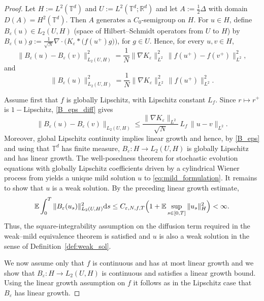 \documentclass[a4paper,12pt]{article}
\newcommand{\mathd}{\mathrm{d}}
\newcommand{\T}{\mathbb{T}}
\begin{document}
\begin{proof} 
Let $H:=L^2(\mathbb T^d)$ and $U:=L^2(\mathbb T^d; \mathbb R^d)$ and let $A:=\frac12\Delta$ with domain
$D(A)=H^2(\mathbb T^d)$.  Then $A$ generates a $C_0$-semigroup on $H$.
For $u\in H$, define $B_\varepsilon(u)\in L_2(U,H)$ (space of Hilbert–Schmidt operators from
$U$ to $H$) by $B_\varepsilon(u)g := \frac{1}{\sqrt{N}}\nabla \cdot \bigl(K_\varepsilon * \bigl(f(u^+)g)\bigr)$, for
$g\in U$. Hence, for every $u,v \in H$,
\begin{equation}\label{B_eps_diff}
    \|B_\varepsilon(u) - B_\varepsilon(v)\|_{L_2(U,H)}^2 =\frac{1}{N}\|\nabla K_\varepsilon\|_{L^2}^2 \,\|f(u^+) - f(v^+)\|_{L^2}^2,
\end{equation}
and 
\begin{equation}\label{B_eps}
    \|B_\varepsilon(u)\|_{L_2(U,H)}^2
=
\frac{1}{N}\|\nabla K_\varepsilon\|_{L^2}^2 \,\|f(u^+)\|_{L^2}^2.
\end{equation}

Assume first that  $f$ is globally Lipschitz, with Lipschitz constant $L_f$. Since $r \mapsto r^+$ is $1-$Lipschitz, 
\eqref{B_eps_diff} gives
\[
\|B_\varepsilon(u)-B_\varepsilon(v)\|_{L_2(U,H)}
\le
\frac{\|\nabla K_\varepsilon\|_{L^2}}{\sqrt{N}}\,L_f\,\|u-v\|_{L^2}.
\]
Moreover, global Lipschitz continuity implies linear growth 
and hence, by \eqref{B_eps} and using that $\T^d$ has finite measure, 
$B_\varepsilon:H\to L_2(U,H)$ is globally Lipschitz and has linear growth. The well-posedness theorem for  stochastic evolution equations with
globally Lipschitz coefficients driven by a cylindrical Wiener process from \cite[Ch. 7]{DaPrato2014} yields a unique
mild solution $u$ to \eqref{eq:mild_formulation}. It remains to show that $u$ is a weak solution. By the preceding
linear growth estimate,
\[
\mathbb{E}\int_0^T
\|B_\varepsilon(u_s)\|_{L_2(U,H)}^2\mathd s
\le
C_{\varepsilon,N,f,T}
\Bigl(1+\mathbb E\sup_{s\in[0,T]}\|u_s\|_H^2\Bigr)<\infty .
\]
Thus,  the
square-integrability assumption on the
diffusion term required in the weak--mild equivalence theorem \cite[Thm 6.5]{DaPrato2014} is satisfied and $u$ is also a weak solution in the sense of Definition~\ref{def:weak_sol}.

 

We now assume only that $f$ is continuous and has at most linear growth and we show that \(B_\varepsilon:H\to L_2(U,H)\) is continuous and satisfies a linear
growth bound. Using the linear growth assumption on $f$ it follows as in the Lipschitz case that $B_\varepsilon$ has linear growth.


\end{proof}
\end{document}
